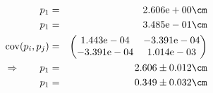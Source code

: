 \begin{eqnarray}
    p_1 &=& 2.606\mathrm{e}+00 \cm \nonumber \\
    p_1 &=& 3.485\mathrm{e}-01 \cm \nonumber \\
    \mathrm{cov}(p_i, p_j) &=& 
    \begin{pmatrix}
        1.443\mathrm{e}-04 &-3.391\mathrm{e}-04 \\
        -3.391\mathrm{e}-04 &1.014\mathrm{e}-03 \\
    \end{pmatrix}
\\ \Rightarrow \qquad
    p_1 &=& 2.606 \pm 0.012 \cm\\
    p_1 &=& 0.349 \pm 0.032 \cm
\end{eqnarray}

